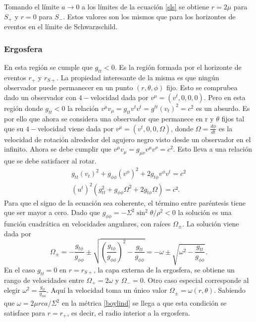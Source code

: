 \documentclass[12pt]{article}
\theoremstyle{plain}
\begin{document}
Tomando el límite $a\rightarrow 0$ a los límites de la ecuación
 \ref{sls} se obtiene $r=2\mu$ para $S_+$ y $r=0$ para $S_-$. Estos valores son los mismos que para los horizontes de eventos en el límite de Schwarzschild.

\subsubsection{Ergosfera}
En esta región se cumple que $g_{tt}<0$. Es la región formada por el horizonte de eventos $r_+$ y $r_{S+}$. La propiedad interesante de la misma es que ningún observador puede permanecer en un punto $(r,\theta,\phi)$ fijo. Esto se comprubea dado un observador con $4-$velocidad dada por $v^{\mu}=(v^t,0,0,0)$. Pero en esta región donde $g_{tt}<0$ la relación $v^{\mu}v_{\mu}=g_{tt}v^tv^t=g^{tt}(v_t)^2=c^2$ es un absurdo. Es por ello que ahora se considera una observador que permanece en r y $\theta$ fijos tal que su $4-$velocidad viene dada por $v^{\mu}=(v^t,0,0,\Omega)$, donde $\Omega=\frac{d\phi}{dt}$ es la velocidad de rotación alrededor del agujero negro visto desde un observador en el infinito. Ahora se debe cumplir que $v^{\mu}v_{\mu}=g_{\mu\nu}v^{\mu}v^{\nu}=c^2$. Esto lleva a una relación que se debe satisfacer al rotar.
\begin{equation}\nonumber
\begin{split}
g_{tt}(v_t)^2+g_{\phi\phi }(v^{\phi })^2+2g_{t\phi }v^{\phi }v^{t}=c^2 \\
(u^t)^2(g_{tt}^2+g_{\phi\phi}\Omega ^2+2g_{t\phi}\Omega )=c².
\end{split}
\end{equation}
Para que el signo de la ecuación sea coherente, el término entre paréntesis tiene que ser mayor a cero. Dado que $g_{\phi\phi} = -\Sigma ^2\sin ^2\theta/\rho ^2<0$ la solución es una función cuadrática en velocidades angulares, con raíces $\Omega _{\pm}$. La solución viene dada por
\begin{equation}
\Omega _{\pm}=-\frac{g_{t\phi}}{g_{\phi\phi}}\pm\sqrt{\left(\frac{g_{t\phi}}{g_{\phi\phi}}\right)^2-\frac{g_{tt}}{g_{\phi\phi}}} = -\omega \pm \sqrt{\omega^2-\frac{g_{tt}}{g_{\phi\phi}}}.
\end{equation}
En el caso $g_{tt}=0$ en $r=r_{S+}$, la capa externa de la ergosfera, se obtiene un rango de velocidades entre $\Omega_+=2\omega$ y $\Omega_-=0$. Otro caso especial corresponde al elegir $\omega ^2=\frac{g_{tt}}{g_{\phi\phi}}$. Aquí la velocidad toma un único valor $\Omega_{\pm}=\omega (r,\theta)$. Sabiendo que $\omega = 2\mu rca/\Sigma ^2$ en la métrica \ref{boylind} se llega a que esta condición se satisface para $r=r_+$, es decir, el radio interior a la ergosfera.
\end{document}
